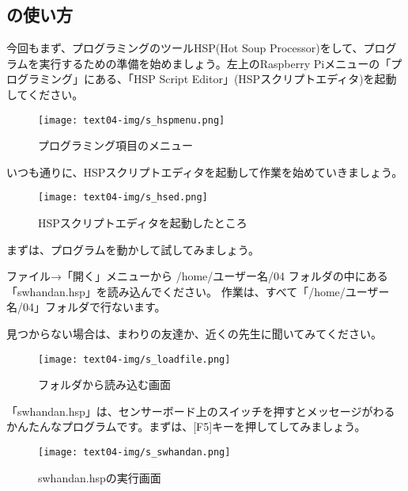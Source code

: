 \newpage
\subsection{の使い方}

今回もまず、プログラミングのツールHSP(Hot Soup Processor)をして、プログラムを実行するための準備を始めましょう。左上のRaspberry Piメニューの「プログラミング」にある、「HSP Script Editor」(HSPスクリプトエディタ)を起動してください。


\begin{figure}[H]
    \begin{center}
      \texttt{[image: text04-img/s\_hspmenu.png]}
      \caption{プログラミング項目のメニュー}
    \end{center}
\end{figure}


いつも通りに、HSPスクリプトエディタを起動して作業を始めていきましょう。

\begin{figure}[H]
    \begin{center}
      \texttt{[image: text04-img/s\_hsed.png]}
      \caption{HSPスクリプトエディタを起動したところ}
    \end{center}
    \label{fig:prog_menu}
\end{figure}
\clearpage



まずは、プログラムを動かして試してみましょう。

ファイル→「開く」メニューから /home/ユーザー名/04 フォルダの中にある「swhandan.hsp」を読み込んでください。
作業は、すべて「/home/ユーザー名/04」フォルダで行ないます。

見つからない場合は、まわりの友達か、近くの先生に聞いてみてください。


\begin{figure}[H]
    \begin{center}
      \texttt{[image: text04-img/s\_loadfile.png]}
      \caption{フォルダから読み込む画面}
    \end{center}
    \label{fig:prog_menu}
\end{figure}


「swhandan.hsp」は、センサーボード上のスイッチを押すとメッセージがわるかんたんなプログラムです。まずは、[F5]キーを押してしてみましょう。


\begin{figure}[H]
    \begin{center}
      \texttt{[image: text04-img/s\_swhandan.png]}
      \caption{swhandan.hspの実行画面}
    \end{center}
    \label{fig:prog_menu}
\end{figure}



